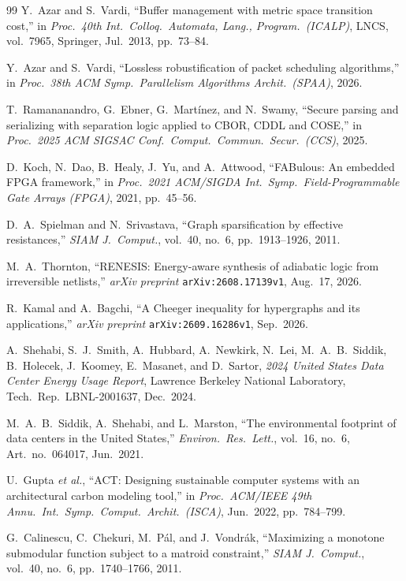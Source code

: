 \documentclass[10pt,twocolumn]{article}
\theoremstyle{spectralthm}
\begin{document}
\begin{thebibliography}{99}
Y.~Azar and S.~Vardi, ``Buffer management with metric space transition cost,'' in \textit{Proc.\ 40th Int.\ Colloq.\ Automata, Lang., Program.\ (ICALP)}, LNCS, vol.~7965, Springer, Jul.\ 2013, pp.~73--84.

Y.~Azar and S.~Vardi, ``Lossless robustification of packet scheduling algorithms,'' in \textit{Proc.\ 38th ACM Symp.\ Parallelism Algorithms Archit.\ (SPAA)}, 2026.

T.~Ramananandro, G.~Ebner, G.~Mart\'{i}nez, and N.~Swamy, ``Secure parsing and serializing with separation logic applied to CBOR, CDDL and COSE,'' in \textit{Proc.\ 2025 ACM SIGSAC Conf.\ Comput.\ Commun.\ Secur.\ (CCS)}, 2025.

D.~Koch, N.~Dao, B.~Healy, J.~Yu, and A.~Attwood, ``FABulous: An embedded FPGA framework,'' in \textit{Proc.\ 2021 ACM/SIGDA Int.\ Symp.\ Field-Programmable Gate Arrays (FPGA)}, 2021, pp.~45--56.

D.~A.~Spielman and N.~Srivastava, ``Graph sparsification by effective resistances,'' \textit{SIAM J.\ Comput.}, vol.~40, no.~6, pp.~1913--1926, 2011.

M.~A.~Thornton, ``RENESIS: Energy-aware synthesis of adiabatic logic from irreversible netlists,'' \textit{arXiv preprint} \texttt{arXiv:2608.17139v1}, Aug.\ 17, 2026.

R.~Kamal and A.~Bagchi, ``A Cheeger inequality for hypergraphs and its applications,'' \textit{arXiv preprint} \texttt{arXiv:2609.16286v1}, Sep.\ 2026.

A.~Shehabi, S.~J.~Smith, A.~Hubbard, A.~Newkirk, N.~Lei, M.~A.~B.~Siddik, B.~Holecek, J.~Koomey, E.~Masanet, and D.~Sartor, \textit{2024 United States Data Center Energy Usage Report}, Lawrence Berkeley National Laboratory, Tech.\ Rep.\ LBNL-2001637, Dec.\ 2024.

M.~A.~B.~Siddik, A.~Shehabi, and L.~Marston, ``The environmental footprint of data centers in the United States,'' \textit{Environ.\ Res.\ Lett.}, vol.~16, no.~6, Art.\ no.~064017, Jun.\ 2021.

U.~Gupta \textit{et al.}, ``ACT: Designing sustainable computer systems with an architectural carbon modeling tool,'' in \textit{Proc.\ ACM/IEEE 49th Annu.\ Int.\ Symp.\ Comput.\ Archit.\ (ISCA)}, Jun.\ 2022, pp.~784--799.

G.~Calinescu, C.~Chekuri, M.~P\'{a}l, and J.~Vondr\'{a}k, ``Maximizing a monotone submodular function subject to a matroid constraint,'' \textit{SIAM J.\ Comput.}, vol.~40, no.~6, pp.~1740--1766, 2011.

\end{thebibliography}
\end{document}
